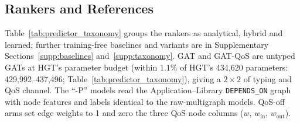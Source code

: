 \documentclass[preprint,3p]{elsarticle}
\begin{document}
\subsection{Rankers and References}
\label{sec:6.2}

Table~\ref{tab:predictor_taxonomy} groups the rankers as analytical, hybrid and learned; further training-free baselines and variants are in Supplementary Sections~\ref{supp:baselines} and~\ref{supp:taxonomy}. GAT and GAT-QoS are untyped GATs at HGT's parameter budget (within $1.1\%$ of HGT's 434{,}620 parameters: 429{,}992--437{,}496; Table~\ref{tab:predictor_taxonomy}), giving a $2\times2$ of typing and QoS channel. The ``-P'' models read the Application--Library \texttt{DEPENDS\_ON} graph with node features and labels identical to the raw-multigraph models. QoS-off arms set edge weights to 1 and zero the three QoS node columns ($w$, $w_{\text{in}}$, $w_{\text{out}}$).
\end{document}
